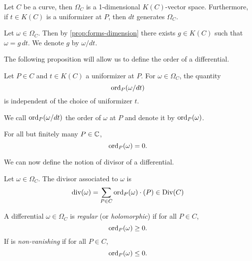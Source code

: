 \begin{proposition}
	\label{prop:forms-dimension}
	Let $C$ be a curve, then $\Omega_C$ is a 1-dimensional $K(C)$-vector space.
	Furthermore, if $t \in K(C)$ is a uniformizer at $P$,
	then $dt$ generates $\Omega_C$.
\end{proposition}

\begin{notation}
	Let $\omega \in \Omega_C$. Then by \ref{prop:forms-dimension} there exists
	$g \in K(C)$ such that $\omega = g\,dt$. We denote $g$ by $\omega/dt$.
\end{notation}

The following proposition will allow us to define the order of a differential.
\begin{proposition}
	Let $P \in C$ and $t \in K(C)$ a uniformizer at $P$. For $\omega \in
	\Omega_C$,
	the quantity
	\begin{equation*}
		\operatorname{ord}_P(\omega/dt)
	\end{equation*}
	is independent of the choice of uniformizer $t$.
\end{proposition}

\begin{definition}
	We call $\operatorname{ord}_P(\omega/dt)$ the order of $\omega$ at $P$ and denote it by
	$\operatorname{ord}_P(\omega)$.
\end{definition}

\begin{proposition}
	For all but finitely many $P \in \mathbb{C}$, 
	\begin{equation*}
		\operatorname{ord}_P(\omega) = 0.
	\end{equation*}
\end{proposition}

We can now define the notion of divisor of a differential.
\begin{definition}
	Let $\omega \in \Omega_C$. The divisor associated to $\omega$ is
	\begin{equation*}
		\operatorname{div}(\omega) = \sum_{P \in C} \operatorname{ord}_P(\omega)\cdot (P) \in \operatorname{Div}(C)
	\end{equation*}
\end{definition}

\begin{definition}
	A differential $\omega \in \Omega_C$ is \emph{regular} (or \emph{holomorphic})
	if for all $P \in C$,
	\begin{equation*}
		\operatorname{ord}_P(\omega) \geq 0.
	\end{equation*}
	If is \emph{non-vanishing} if for all $P \in C$,
	\begin{equation*}
		\operatorname{ord}_P(\omega) \leq 0.
	\end{equation*}
\end{definition}

